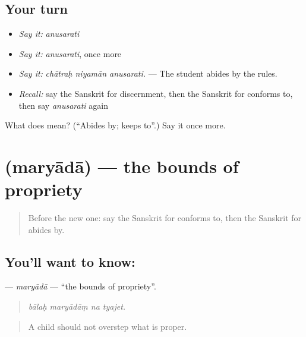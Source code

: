 \subsection*{Your turn}
\begin{itemize}
\raggedright
  \item \emph{Say it:} \emph{anusarati}
  \item \emph{Say it:} \emph{anusarati}, once more
  \item \emph{Say it:} \emph{chātraḥ niyamān anusarati.} — The student abides by the rules.
  \item \emph{Recall:} say the Sanskrit for discernment, then the Sanskrit for conforms to, then say \emph{anusarati} again
\end{itemize}

\begin{tcolorbox}[breakable,colback=teal!4,colframe=teal!35!black,title={Before you move on}]
What does  mean? (\textquotedblleft{}Abides by; keeps to\textquotedblright{}.) Say it once more.
\end{tcolorbox}
\section[\texorpdfstring{\sk{मर्यादा} (maryādā)}{मर्यादा (maryādā)}]{ (maryādā) — the bounds of propriety}

\label{lesson:SA-C351-maryada}



\begin{quote}
Before the new one: say the Sanskrit for conforms to, then the Sanskrit for abides by.
\end{quote}

\subsection*{You'll want to know: }
\textbf{} — \emph{maryādā} — \textquotedblleft{}the bounds of propriety\textquotedblright{}.

\begin{quote}
   
\end{quote}

\begin{quote}
\emph{bālaḥ maryādāṃ na tyajet.}
\end{quote}

\begin{quote}
A child should not overstep what is proper.
\end{quote}

